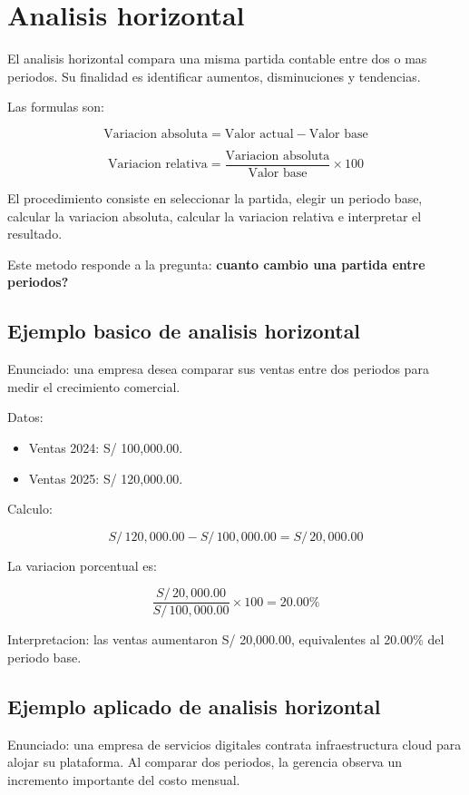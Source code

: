 \section{Analisis horizontal}

El analisis horizontal compara una misma partida contable entre dos o mas periodos. Su finalidad es identificar aumentos, disminuciones y tendencias.

Las formulas son:

\[
\text{Variacion absoluta} = \text{Valor actual} - \text{Valor base}
\]

\[
\text{Variacion relativa} =
\frac{\text{Variacion absoluta}}{\text{Valor base}} \times 100
\]

El procedimiento consiste en seleccionar la partida, elegir un periodo base, calcular la variacion absoluta, calcular la variacion relativa e interpretar el resultado.

Este metodo responde a la pregunta: \textbf{cuanto cambio una partida entre periodos?}

\subsection{Ejemplo basico de analisis horizontal}

Enunciado: una empresa desea comparar sus ventas entre dos periodos para medir el crecimiento comercial.

Datos:

\begin{itemize}
  \item Ventas 2024: S/ 100,000.00.
  \item Ventas 2025: S/ 120,000.00.
\end{itemize}

Calculo:

\[
S/\,120,000.00 - S/\,100,000.00 = S/\,20,000.00
\]

La variacion porcentual es:

\[
\frac{S/\,20,000.00}{S/\,100,000.00} \times 100 = 20.00\%
\]

Interpretacion: las ventas aumentaron S/ 20,000.00, equivalentes al 20.00\% del periodo base.

\subsection{Ejemplo aplicado de analisis horizontal}

Enunciado: una empresa de servicios digitales contrata infraestructura cloud para alojar su plataforma. Al comparar dos periodos, la gerencia observa un incremento importante del costo mensual.

